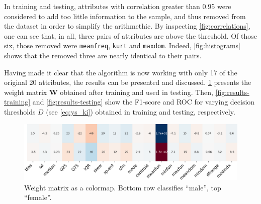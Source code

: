 In training and testing, attributes with correlation greater than 0.95
were considered to add too little information to the sample, 
and thus removed from the dataset in order to simplify the arithmethic.
%
By inspecting \cref{fig:correlations},
one can see that, in all, three pairs of attributes are above the threshold.
%
Of those six, those removed were 
\texttt{meanfreq}, \texttt{kurt} and \texttt{maxdom}.
%
Indeed, \cref{fig:histograms} shows that the removed three are 
nearly identical to their pairs.

Having made it clear that the algorithm is now working with 
only 17 of the original 20 attributes, the results can be presented and discussed.
\cref{fig:weight-matrix} presents the weight matrix $\mathbf{W}$ obtained after training and used in testing.
%
Then,
\cref{fig:results-training} and 
\cref{fig:results-testing} 
show the F1-score and ROC for varying decision thresholds $D$ (see \eqref{eq:ys_ki}) 
obtained in training and testing, respectively.
%
\begin{figure}[htbp]
    \centering 
    \caption{
        Weight matrix as a colormap. 
        Bottom row classifies ``male'', top ``female''.
    }
    \label{fig:weight-matrix}
    \includegraphics[width=.9\linewidth]{../../python_code/plots/logistic_regression/weight_matrix.png}
\end{figure}

